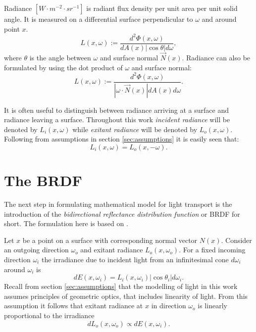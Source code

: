 \begin{df}
Radiance $[W \cdot m^{-2} \cdot sr^{-1}]$ is radiant flux density per unit area per unit solid angle. It is measured on a differential surface perpendicular to $\omega$ and around point $x$.
\begin{equation}
  L(x,\omega) := \frac{d^{2}\Phi(x, \omega)}{dA(x) |\cos\theta| d\omega},
\end{equation}
where $\theta$ is the angle between $\omega$ and surface normal $\vec{N}(x)$. Radiance can also be formulated by using the dot product of $\omega$ and surface normal:
\begin{equation}
  L(x, \omega) := \frac{d^{2}\Phi(x, \omega)}{|\omega \cdot \vec{N}(x)| dA(x) d\omega}.
\end{equation}
\end{df}

It is often useful to distinguish between radiance arriving at a surface and radiance leaving a surface. Throughout this work \emph{incident radiance} will be denoted by $L_{i}(x, \omega)$ while \emph{exitant radiance} will be denoted by $L_{o}(x, \omega)$. Following from assumptions in section \ref{sec:assumptions} it is easily seen that:
\begin{equation}
  L_{i}(x, \omega) = L_{o}(x, -\omega).
\end{equation}

\section{The BRDF}
The next step in formulating mathematical model for light transport is the introduction of the \emph{bidirectional reflectance distribution function} or BRDF for short. The formulation here is based on \cite{veach97}.

Let $x$ be a point on a surface with corresponding normal vector $N(x)$. Consider an outgoing direction $\omega_{o}$ and exitant radiance $L_{o}(x, \omega_{o})$. For a fixed incoming direction $\omega_{i}$ the irradiance due to incident light from an infinitesimal cone $d\omega_{i}$ around $\omega_{i}$ is
\begin{equation}
  dE(x, \omega_{i}) = L_{i}(x, \omega_{i}) |\cos\theta_{i}| d\omega_{i}.
\end{equation}
Recall from section \ref{sec:assumptions} that the modelling of light in this work assumes principles of geometric optics, that includes linearity of light. From this assumption it follows that exitant radiance at $x$ in direction $\omega_{o}$ is linearly proportional to the irradiance
\begin{equation}
  dL_{o}(x, \omega_{o}) \propto dE(x, \omega_{i}).
\end{equation}

